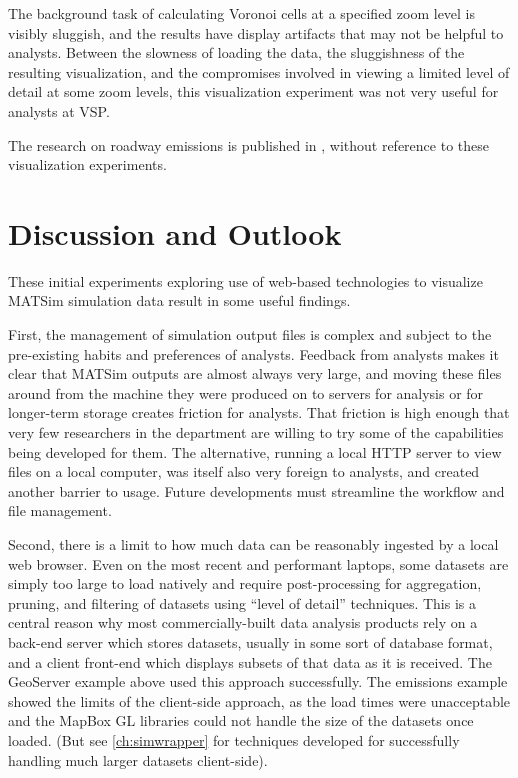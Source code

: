 The background task of calculating Voronoi cells at a specified zoom level is visibly sluggish, and the results have display artifacts that may not be helpful to analysts. Between the slowness of loading the data, the sluggishness of the resulting visualization, and the compromises involved in viewing a limited level of detail at some zoom levels, this visualization experiment was not very useful for analysts at VSP.

The research on roadway emissions is published in \cite{kaddoura2022exhaust}, without reference to these visualization experiments.

\hypertarget{server-experiments-findings}{%
\section{Discussion and Outlook}\label{server-experiments-findings}}

These initial experiments exploring use of web-based technologies to visualize MATSim simulation data result in some useful findings.

First, the management of simulation output files is complex and subject to the pre-existing habits and preferences of analysts. Feedback from analysts makes it clear that MATSim outputs are almost always very large, and moving these files around from the machine they were produced on to servers for analysis or for longer-term storage creates friction for analysts. That friction is high enough that very few researchers in the department are willing to try some of the capabilities being developed for them. The alternative, running a local HTTP server to view files on a local computer, was itself also very foreign to analysts, and created another barrier to usage. Future developments must streamline the workflow and file management.

Second, there is a limit to how much data can be reasonably ingested by a local web browser. Even on the most recent and performant laptops, some datasets are simply too large to load natively and require post-processing for aggregation, pruning, and filtering of datasets using ``level of detail'' techniques. This is a central reason why most commercially-built data analysis products rely on a back-end server which stores datasets, usually in some sort of database format, and a client front-end which displays subsets of that data as it is received. The GeoServer example above used this approach successfully. The emissions example showed the limits of the client-side approach, as the load times were unacceptable and the MapBox GL libraries could not handle the size of the datasets once loaded. (But see \autoref{ch:simwrapper} for techniques developed for successfully handling much larger datasets client-side).

